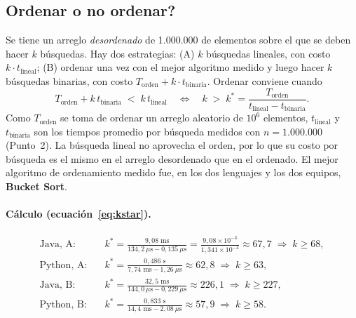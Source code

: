 \documentclass[11pt,a4paper]{article}
\begin{document}
\subsection{\textquestiondown Ordenar o no ordenar?}\label{sec:q2}

Se tiene un arreglo \emph{desordenado} de 1.000.000 de elementos sobre el que se deben hacer $k$ b\'usquedas.
Hay dos estrategias: (A) $k$ b\'usquedas lineales, con costo $k\cdot t_{\text{lineal}}$; (B) ordenar una vez con el
mejor algoritmo medido y luego hacer $k$ b\'usquedas binarias, con costo $T_{\text{orden}}+k\cdot
t_{\text{binaria}}$. Ordenar conviene cuando
\begin{equation}
  T_{\text{orden}}+k\,t_{\text{binaria}}\;<\;k\,t_{\text{lineal}}
  \quad\Longleftrightarrow\quad
  k\;>\;k^*=\frac{T_{\text{orden}}}{t_{\text{lineal}}-t_{\text{binaria}}}.\label{eq:kstar}
\end{equation}
Como $T_{\text{orden}}$ se toma de ordenar un arreglo aleatorio de $10^6$ elementos, $t_{\text{lineal}}$ y
$t_{\text{binaria}}$ son los tiempos promedio por b\'usqueda medidos con $n=1.000.000$ (Punto~2). La b\'usqueda
lineal no aprovecha el orden, por lo que su costo por b\'usqueda es el mismo en el arreglo desordenado que en el
ordenado. El mejor algoritmo de ordenamiento medido fue, en los dos lenguajes y los dos equipos, \textbf{Bucket
Sort}.

\begin{table}[htbp]
\centering
\caption{C\'alculo del umbral $k^*$ con $n=1.000.000$.}\label{tab:q2}

\end{table}

\paragraph{C\'alculo (ecuaci\'on~\eqref{eq:kstar}).}
\begin{align*}
  \text{Java, A:}\quad & k^*=\frac{9{,}08\text{ ms}}{134{,}2\ \mu\text{s}-0{,}135\ \mu\text{s}}=\frac{9{,}08\times10^{-3}}{1{,}341\times10^{-4}}\approx67{,}7
    \;\Rightarrow\; k\ge68,\\
  \text{Python, A:}\quad & k^*=\frac{0{,}486\text{ s}}{7{,}74\text{ ms}-1{,}26\ \mu\text{s}}\approx62{,}8
    \;\Rightarrow\; k\ge63,\\
  \text{Java, B:}\quad & k^*=\frac{32{,}5\text{ ms}}{144{,}0\ \mu\text{s}-0{,}229\ \mu\text{s}}\approx226{,}1
    \;\Rightarrow\; k\ge227,\\
  \text{Python, B:}\quad & k^*=\frac{0{,}833\text{ s}}{14{,}4\text{ ms}-2{,}08\ \mu\text{s}}\approx57{,}9
    \;\Rightarrow\; k\ge58.
\end{align*}
\end{document}

